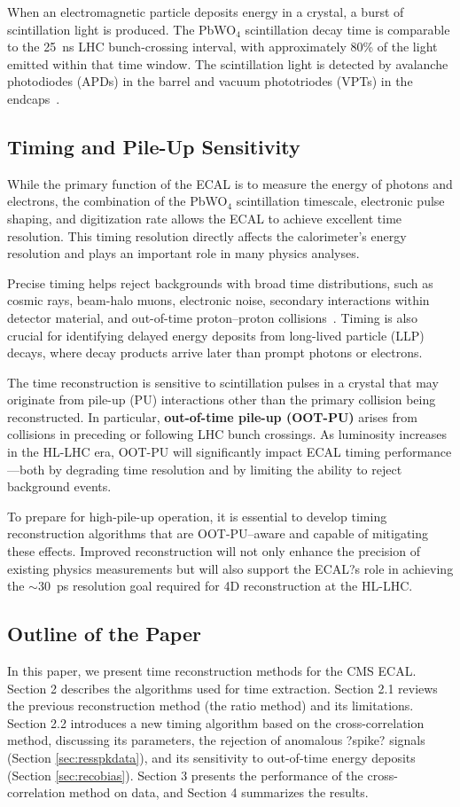 \documentclass[12pt,a4paper]{article}
\begin{document}
When an electromagnetic particle deposits energy in a crystal, a burst of scintillation light is produced. The PbWO$_4$ scintillation decay time is comparable to the 25~ns LHC bunch-crossing interval, with approximately 80\% of the light emitted within that time window. The scintillation light is detected by avalanche photodiodes (APDs) in the barrel and vacuum phototriodes (VPTs) in the endcaps~\cite{Bayatian:2006nff}.

\subsection{Timing and Pile-Up Sensitivity}
While the primary function of the ECAL is to measure the energy of photons and electrons, the combination of the PbWO$_4$ scintillation timescale, electronic pulse shaping, and digitization rate allows the ECAL to achieve excellent time resolution. This timing resolution directly affects the calorimeter's energy resolution and plays an important role in many physics analyses.

Precise timing helps reject backgrounds with broad time distributions, such as cosmic rays, beam-halo muons, electronic noise, secondary interactions within detector material, and out-of-time proton--proton collisions~\cite{Bruneliere:2006ra}. Timing is also crucial for identifying delayed energy deposits from long-lived particle (LLP) decays, where decay products arrive later than prompt photons or electrons.

The time reconstruction is sensitive to scintillation pulses in a crystal that may originate from pile-up (PU) interactions other than the primary collision being reconstructed. In particular, \textbf{out-of-time pile-up (OOT-PU)} arises from collisions in preceding or following LHC bunch crossings. As luminosity increases in the HL-LHC era, OOT-PU will significantly impact ECAL timing performance---both by degrading time resolution and by limiting the ability to reject background events.

To prepare for high-pile-up operation, it is essential to develop timing reconstruction algorithms that are OOT-PU--aware and capable of mitigating these effects. Improved reconstruction will not only enhance the precision of existing physics measurements but will also support the ECAL?s role in achieving the $\sim$30~ps resolution goal required for 4D reconstruction at the HL-LHC.

\subsection{Outline of the Paper}
In this paper, we present time reconstruction methods for the CMS ECAL. Section 2 describes the algorithms used for time extraction. Section 2.1 reviews the previous reconstruction method (the ratio method) and its limitations. Section 2.2 introduces a new timing algorithm based on the cross-correlation method, discussing its parameters, the rejection of anomalous ?spike? signals (Section \ref{sec:resspkdata}), and its sensitivity to out-of-time energy deposits (Section \ref{sec:recobias}). Section 3 presents the performance of the cross-correlation method on data, and Section 4 summarizes the results.
\end{document}
